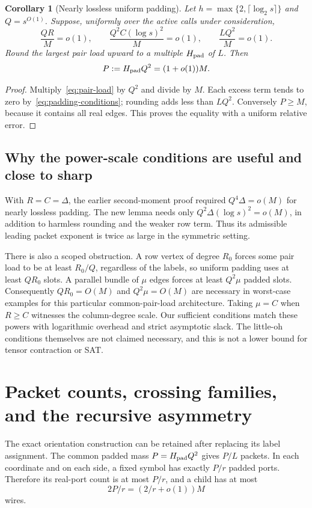 \documentclass[11pt,letterpaper]{article}
\newtheorem{corollary}[theorem]{Corollary}
\theoremstyle{remark}\newtheorem{remark}[theorem]{Remark}
\begin{document}
\begin{corollary}[Nearly lossless uniform padding]\label{cor:padding}
Let $h=\max\{2,\lceil\log_2s\rceil\}$ and $Q=s^{O(1)}$.
Suppose, uniformly over the active calls under consideration,
\begin{equation}\label{eq:padding-conditions}
 \frac{QR}{M}=o(1),\qquad
 \frac{Q^2C(\log s)^2}{M}=o(1),\qquad
 \frac{LQ^2}{M}=o(1).
\end{equation}
Round the largest pair load upward to a multiple $H_{\rm pad}$ of $L$.
Then
\begin{equation}\label{eq:padded-mass}
 P:=H_{\rm pad}Q^2=(1+o(1))M.
\end{equation}
\end{corollary}
\begin{proof}
Multiply~\eqref{eq:pair-load} by $Q^2$ and divide by $M$.
Each excess term tends to zero by~\eqref{eq:padding-conditions}; rounding
adds less than $LQ^2$. Conversely $P\ge M$, because it contains all real
edges. This proves the equality with a uniform relative error.
\end{proof}

\subsection{Why the power-scale conditions are useful and close to sharp}
With $R=C=\Delta$, the earlier second-moment proof required
$Q^4\Delta=o(M)$ for nearly lossless padding. The new lemma needs only
$Q^2\Delta(\log s)^2=o(M)$, in addition to harmless rounding and the
weaker row term. Thus its admissible leading packet exponent is twice
as large in the symmetric setting.

There is also a scoped obstruction. A row vertex of degree $R_0$ forces
some pair load to be at least $R_0/Q$, regardless of the labels, so
uniform padding uses at least $QR_0$ slots. A parallel bundle of
$\mu$ edges forces at least $Q^2\mu$ padded slots. Consequently
$QR_0=O(M)$ and $Q^2\mu=O(M)$ are necessary in worst-case examples for
this particular common-pair-load architecture. Taking $\mu=C$ when
$R\ge C$ witnesses the column-degree scale. Our sufficient conditions
match these powers with logarithmic overhead and strict asymptotic
slack. The little-oh conditions themselves are not claimed necessary,
and this is not a lower bound for tensor contraction or SAT.

\section{Packet counts, crossing families, and the recursive asymmetry}
\label{sec:packets}
The exact orientation construction can be retained after replacing its
label assignment. The common padded mass $P=H_{\rm pad}Q^2$ gives
$P/L$ packets. In each coordinate and on each side, a fixed symbol has
exactly $P/r$ padded ports. Therefore its real-port count is at most
$P/r$, and a child has at most
\begin{equation}\label{eq:child-size}
 2P/r=(2/r+o(1))M
\end{equation}
wires.
\end{document}
